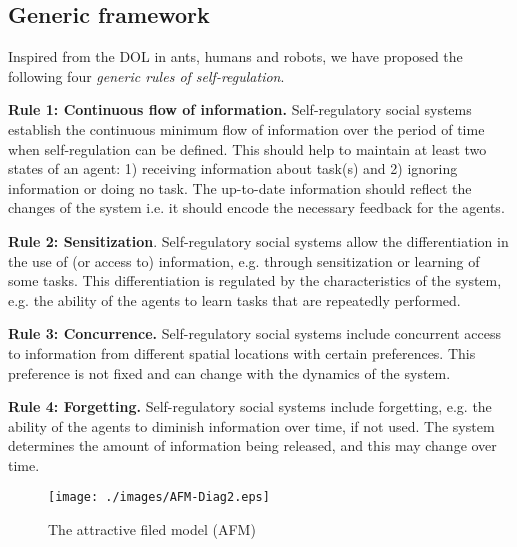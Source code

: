 \documentclass{intech}
\begin{document}
\subsection{Generic framework}
\label{afm:framework}
Inspired from the DOL in ants, humans and robots,  we  have proposed the following four {\em generic rules of self-regulation}.

\textbf{Rule 1: Continuous flow of information.} Self-regulatory social systems establish the continuous minimum flow of information over the period of time when self-regulation can be defined. This should help to maintain at least two states of an agent: 1) receiving information about task(s) and 2) ignoring information or doing no task. The up-to-date information should reflect  the changes of the system i.e. it should encode the necessary feedback for the agents. %


\textbf{Rule 2: Sensitization}. Self-regulatory social systems allow the differentiation in the use of  (or access to) information, e.g. through sensitization or learning of some tasks. This differentiation is regulated by the characteristics of the system, e.g. the ability of the agents to learn tasks that are repeatedly performed.

\textbf{Rule 3: Concurrence.} Self-regulatory social systems include concurrent access to information from different spatial locations with certain preferences. This preference is not fixed and can change with the dynamics of the system. 

\textbf{Rule 4: Forgetting.} Self-regulatory social systems include forgetting, e.g. the ability of the agents to diminish information over time, if not used. The system determines the amount of information being released, and this may change over time. %
\begin{figure}
\centering
\texttt{[image: ./images/AFM-Diag2.eps]}
\caption{The attractive filed model (AFM)}
\label{fig:afm} %
\end{figure}
\end{document}
